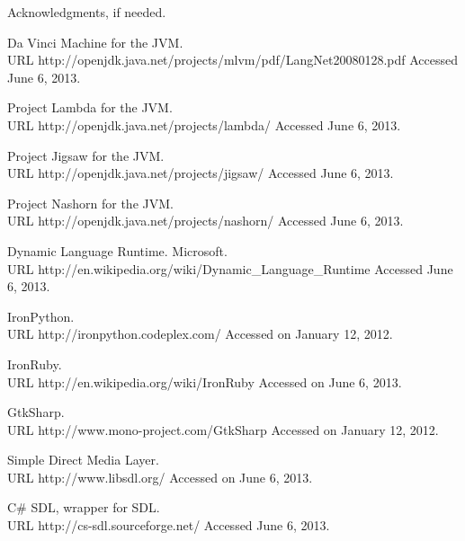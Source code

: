 \documentclass[preprint]{sigplanconf}
\begin{document}

\acks

Acknowledgments, if needed.





\begin{thebibliography}{}
\softraggedright

Da Vinci Machine for the JVM.\\ URL http://openjdk.java.net/projects/mlvm/pdf/LangNet20080128.pdf Accessed June 6, 2013.

Project Lambda for the JVM.\\ URL http://openjdk.java.net/projects/lambda/ Accessed June 6, 2013.

Project Jigsaw for the JVM.\\ URL http://openjdk.java.net/projects/jigsaw/ Accessed June 6, 2013.

Project Nashorn for the JVM.\\ URL http://openjdk.java.net/projects/nashorn/ Accessed June 6, 2013.

Dynamic Language Runtime. Microsoft.\\ URL http://en.wikipedia.org/wiki/Dynamic\_Language\_Runtime Accessed June 6, 2013.

IronPython.\\ URL http://ironpython.codeplex.com/ Accessed on January 12, 2012.

IronRuby.\\ URL http://en.wikipedia.org/wiki/IronRuby Accessed on June 6, 2013.

GtkSharp.\\ URL http://www.mono-project.com/GtkSharp Accessed on January 12, 2012.

Simple Direct Media Layer.\\ URL http://www.libsdl.org/ Accessed on June 6, 2013.

C\# SDL, wrapper for SDL.\\ URL http://cs-sdl.sourceforge.net/ Accessed June 6, 2013.


\end{thebibliography}
\end{document}
